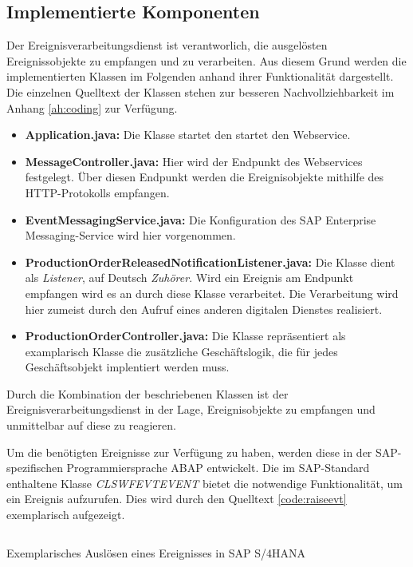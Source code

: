 \subsection{Implementierte Komponenten}
Der Ereignisverarbeitungsdienst ist verantworlich, die ausgelösten Ereignissobjekte zu empfangen und zu verarbeiten. Aus diesem Grund werden die implementierten Klassen im Folgenden anhand ihrer Funktionalität dargestellt. Die einzelnen Quelltext der Klassen stehen zur besseren Nachvollziehbarkeit im Anhang \ref{ah:coding} zur Verfügung.

\begin{itemize}
    \item \textbf{Application.java: } Die Klasse startet den startet den Webservice.
    \item \textbf{MessageController.java: } Hier wird der Endpunkt des Webservices festgelegt. Über diesen Endpunkt werden die Ereignisobjekte mithilfe des \ac{HTTP}-Protokolls empfangen.
    \item \textbf{EventMessagingService.java: } Die Konfiguration des SAP Enterprise Messaging-Service wird hier vorgenommen.
    \item \textbf{ProductionOrderReleasedNotificationListener.java: } Die Klasse dient als \textit{Listener}, auf Deutsch \textit{Zuhörer}. Wird ein Ereignis am Endpunkt empfangen wird es an durch diese Klasse verarbeitet. Die Verarbeitung wird hier zumeist durch den Aufruf eines anderen digitalen Dienstes realisiert.
    \item \textbf{ProductionOrderController.java: } Die Klasse repräsentiert als examplarisch Klasse die zusätzliche Geschäftslogik, die für jedes Geschäftsobjekt implentiert werden muss.
\end{itemize}

Durch die Kombination der beschriebenen Klassen ist der Ereignisverarbeitungsdienst in der Lage, Ereignisobjekte zu empfangen und unmittelbar auf diese zu reagieren.

Um die benötigten Ereignisse zur Verfügung zu haben, werden diese in der SAP-spezifischen Programmiersprache ABAP entwickelt. Die im SAP-Standard enthaltene Klasse \textit{CL\textunderscore SWF\textunderscore EVT\textunderscore EVENT} bietet die notwendige Funktionalität, um ein Ereignis aufzurufen. Dies wird durch den Quelltext \ref{code:raiseevt} exemplarisch aufgezeigt.
\begin{algorithm}[H]
\centering 
\inputminted[linenos]{ABAP}{code/RaiseEvent.abap}
\caption{Exemplarisches Auslösen eines Ereignisses in SAP S/4HANA}
\label{code:raiseevt}
\end{algorithm}

